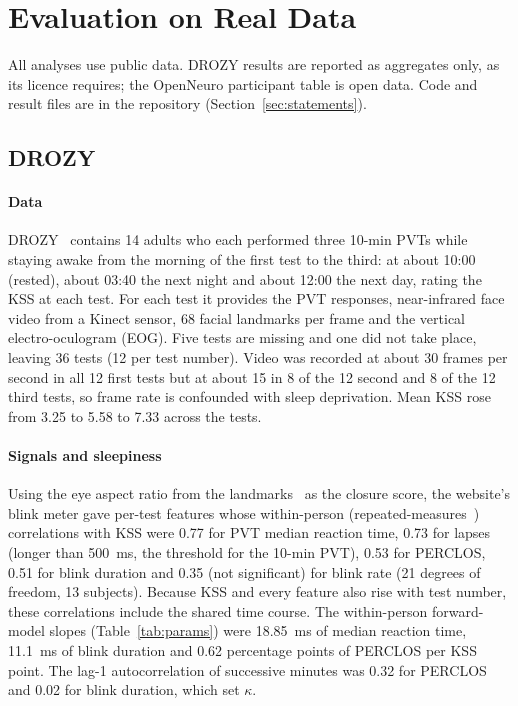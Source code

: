 \section{Evaluation on Real Data}
\label{sec:realdata}

All analyses use public data. DROZY results are reported as aggregates only, as its licence requires; the OpenNeuro participant table is open data. Code and result files are in the repository (Section~\ref{sec:statements}).

\subsection{DROZY}
\label{sec:drozy}
\paragraph*{Data} DROZY~\cite{massoz2016ulg} contains 14 adults who each performed three 10-min PVTs while staying awake from the morning of the first test to the third: at about 10:00 (rested), about 03:40 the next night and about 12:00 the next day, rating the KSS at each test. For each test it provides the PVT responses, near-infrared face video from a Kinect sensor, 68 facial landmarks per frame and the vertical electro-oculogram (EOG). Five tests are missing and one did not take place, leaving 36 tests (12 per test number). Video was recorded at about 30 frames per second in all 12 first tests but at about 15 in 8 of the 12 second and 8 of the 12 third tests, so frame rate is confounded with sleep deprivation. Mean KSS rose from 3.25 to 5.58 to 7.33 across the tests.

\paragraph*{Signals and sleepiness} Using the eye aspect ratio from the landmarks~\cite{soukupova2016real} as the closure score, the website's blink meter gave per-test features whose within-person (repeated-measures~\cite{bakdash2017repeated}) correlations with KSS were 0.77 for PVT median reaction time, 0.73 for lapses (longer than 500~ms, the threshold for the 10-min PVT), 0.53 for PERCLOS, 0.51 for blink duration and 0.35 (not significant) for blink rate (21 degrees of freedom, 13 subjects). Because KSS and every feature also rise with test number, these correlations include the shared time course. The within-person forward-model slopes (Table~\ref{tab:params}) were 18.85~ms of median reaction time, 11.1~ms of blink duration and 0.62 percentage points of PERCLOS per KSS point. The lag-1 autocorrelation of successive minutes was 0.32 for PERCLOS and 0.02 for blink duration, which set $\kappa$.

